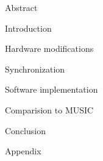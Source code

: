 




\usepackage{antropy_en}


  

  \begin{topchapter}{Abstract}
    
  \end{topchapter}

  \begin{topchapter}{Introduction}
    
  \end{topchapter}

  \begin{topchapter}{Hardware modifications}
    
  \end{topchapter}

  \begin{topchapter}{Synchronization}
    
  \end{topchapter}

  \begin{topchapter}{Software implementation}
    
  \end{topchapter}

  \begin{topchapter}{Comparision to MUSIC}
    
  \end{topchapter}

  \begin{topchapter}{Conclusion}
    
  \end{topchapter}

  \newpage
  \printbibliography
  \printglossaries

  \begin{topchapter}{Appendix}
    
  \end{topchapter}

